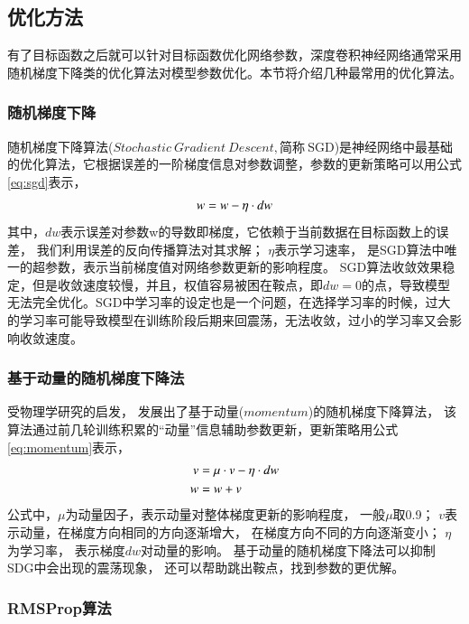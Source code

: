 \subsection{优化方法}

有了目标函数之后就可以针对目标函数优化网络参数，深度卷积神经网络通常采用随机梯度下降类的优化算法对模型参数优化。本节将介绍几种最常用的优化算法。

\subsubsection{随机梯度下降}

随机梯度下降算法($Stochastic~Gradient~Descent,\mbox{简称}~\mbox{SGD}$)是神经网络中最基础的优化算法，它根据误差的一阶梯度信息对参数调整，参数的更新策略可以用公式\eqref{eq:sgd}表示，
\begin{equation}
\centering
w=w-\eta \cdot dw
\label{eq:sgd}
\end{equation}
其中，$dw$表示误差对参数w的导数即梯度，它依赖于当前数据在目标函数上的误差，
我们利用误差的反向传播算法对其求解；
$\eta$表示学习速率，
是SGD算法中唯一的超参数，表示当前梯度值对网络参数更新的影响程度。
SGD算法收敛效果稳定，但是收敛速度较慢，并且，权值容易被困在鞍点，即$dw=0$的点，导致模型无法完全优化。SGD中学习率的设定也是一个问题，在选择学习率的时候，过大的学习率可能导致模型在训练阶段后期来回震荡，无法收敛，过小的学习率又会影响收敛速度。

\subsubsection{基于动量的随机梯度下降法}

受物理学研究的启发，
发展出了基于动量\cite{qian1999momentum}($momentum$)的随机梯度下降算法，
该算法通过前几轮训练积累的“动量”信息辅助参数更新，更新策略用公式\eqref{eq:momentum}表示，
\begin{equation}
\begin{aligned}
\centering
v & =\mu \cdot v-\eta \cdot dw \\
w & =w+v
\end{aligned}
\label{eq:momentum}
\end{equation}
公式中，$\mu$为动量因子，表示动量对整体梯度更新的影响程度，
一般$\mu$取0.9；
$v$表示动量，在梯度方向相同的方向逐渐增大，
在梯度方向不同的方向逐渐变小；
$\eta$为学习率，
表示梯度$dw$对动量的影响。
基于动量的随机梯度下降法可以抑制SDG中会出现的震荡现象，
还可以帮助跳出鞍点，找到参数的更优解。

\subsubsection{RMSProp算法}

